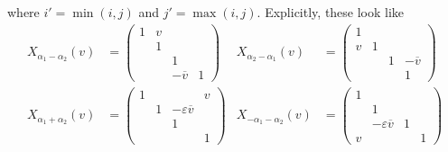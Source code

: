 \documentclass[12pt]{article}
\theoremstyle{definition}
\numberwithin{theorem}{subsection}
\newcommand{\eps}{\varepsilon}
\newcommand{\ov}{\overline}
\begin{document}
where $i' = \min(i,j)$ and $j' = \max(i,j)$. Explicitly, these look like
\begin{align*}
	X_{\alpha_1 - \alpha_2}(v) &=
	\begin{pmatrix}
		1 & v \\
		& 1 \\
		&& 1 \\
		&& - \ov v & 1
	\end{pmatrix}
	 &
	X_{\alpha_2 - \alpha_1}(v) &=
	\begin{pmatrix}
		1 \\
		v & 1 && \\
		&& 1 & - \ov v \\
		&&& 1
	\end{pmatrix} \\[2ex]
	X_{\alpha_1 + \alpha_2}(v) &= 
		\begin{pmatrix}
		1 &&& v \\
		& 1 & - \eps \ov v \\
		&& 1 \\
		&&& 1
	\end{pmatrix} 
	&
	X_{-\alpha_1 - \alpha_2}(v) &=
	\begin{pmatrix}
		1 \\
		& 1 \\
		& - \eps \ov v & 1 \\
		v &&& 1
	\end{pmatrix} 
\end{align*}
\end{document}
